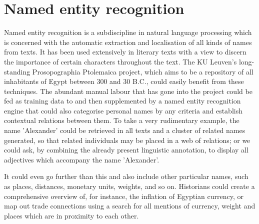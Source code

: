 

\section{Named entity recognition} %
\label{sec:ner}

Named entity recognition is a subdiscipline in natural language processing
which is concerned with the automatic extraction and localisation of all kinds
of names from texts. It has been used extensively in literary texts with a view
to discern the importance of certain characters throughout the text. The KU
Leuven's long-standing Prosopographia Ptolemaica project, which aims to be a
repository of all inhabitants of Egypt between 300 and 30 B.C., could easily
benefit from these techniques. The abundant manual labour that has gone into
the project could be fed as training data to and then supplemented by a named
entity recognition engine that could also categorise personal names by any
criteria and establish contextual relations between them. To take a very
rudimentary example, the name 'Alexander' could be retrieved in all texts and a
cluster of related names generated, so that related individuals may be placed
in a web of relations; or we could ask, by combining the already present
linguistic annotation, to display all adjectives which accompany the name
'Alexander'.

It could even go further than this and also include other particular names,
such as places, distances, monetary units, weights, and so on. Historians could
create a comprehensive overview of, for instance, the inflation of Egyptian
currency, or map out trade connections using a search for all mentions of
currency, weight and places which are in proximity to each other.




